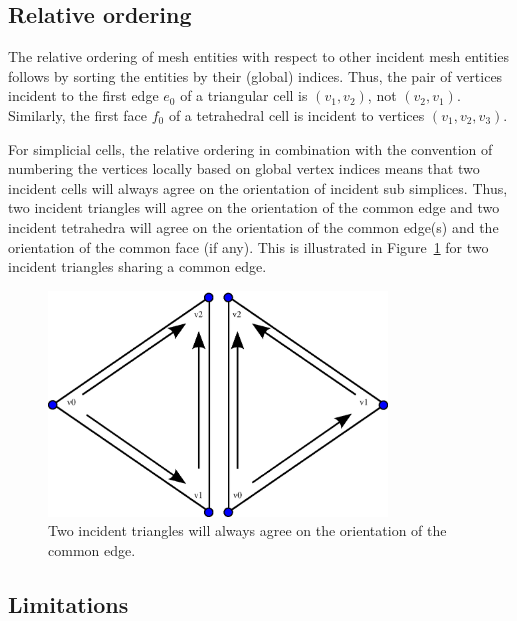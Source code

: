 \subsection{Relative ordering}

The relative ordering of mesh entities with respect to other incident
mesh entities follows by sorting the entities by their (global)
indices. Thus, the pair of vertices incident to the first edge $e_0$
of a triangular cell is $(v_1, v_2)$, not $(v_2, v_1)$. Similarly, the
first face $f_0$ of a tetrahedral cell is incident to vertices $(v_1,
v_2, v_3)$.

For simplicial cells, the relative ordering in combination with the
convention of numbering the vertices locally based on global vertex
indices means that two incident cells will always agree on the
orientation of incident sub simplices. Thus, two incident triangles
will agree on the orientation of the common edge and two incident
tetrahedra will agree on the orientation of the common edge(s) and the
orientation of the common face (if any). This is illustrated in
Figure~\ref{fig:orientation_example_triangles} for two incident
triangles sharing a common edge.

\begin{figure}[htbp]
  \begin{center}
    \includegraphics[width=9cm]{eps/orientation_example_triangles.eps}
    \caption{Two incident triangles will always agree on the
      orientation of the common edge.}
    \label{fig:orientation_example_triangles}
  \end{center}
\end{figure}

\subsection{Limitations}
 
